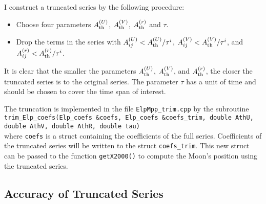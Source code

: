 \documentclass[12pt]{article}
\begin{document}
I construct a truncated series by the following procedure:

\begin{itemize}
\item Choose four parameters $A^{(U)}_{\rm th}$, $A^{(V)}_{\rm th}$,
$A^{(r)}_{\rm th}$ and $\tau$.

\item Drop the terms in the series with $A^{(U)}_{ij} < A^{(U)}_{\rm th} /\tau^i$,
$A^{(V)}_{ij} < A^{(V)}_{\rm th} /\tau^i$, and
$A^{(r)}_{ij} < A^{(r)}_{\rm th} /\tau^i$.
\end{itemize}

It is clear that the smaller the parameters $A^{(U)}_{\rm th}$, $A^{(V)}_{\rm th}$,
and $A^{(r)}_{\rm th}$, the closer the truncated series is to the original series.
The parameter $\tau$ has a unit of time and should be chosen to cover the time span 
of interest.

The truncation is implemented in the file {\tt ElpMpp\_trim.cpp} by the subroutine \\
{\tt trim\_Elp\_coefs(Elp\_coefs \&coefs, Elp\_coefs \&coefs\_trim,
                    double AthU, double AthV, double AthR, double tau)} \\
where {\tt coefs} is a struct containing the coefficients of the full series. 
Coefficients of the truncated series will be written to the struct {\tt coefs\_trim}. 
This new struct can be passed to the function {\tt getX2000()} to 
compute the Moon's position using the truncated series.

\subsection{Accuracy of Truncated Series}
\end{document}
